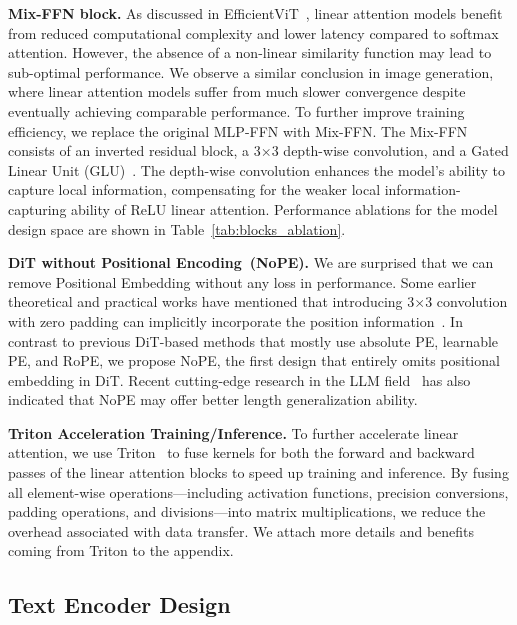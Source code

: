 \noindent\textbf{Mix-FFN block.}
As discussed in EfficientViT~\citep{cai2023efficientvit}, linear attention models benefit from reduced computational complexity and lower latency compared to softmax attention. However, the absence of a non-linear similarity function may lead to sub-optimal performance. We observe a similar conclusion in image generation, where linear attention models suffer from much slower convergence despite eventually achieving comparable performance.
To further improve training efficiency, we replace the original MLP-FFN with Mix-FFN. The Mix-FFN consists of an inverted residual block, a 3$\times$3 depth-wise convolution, and a Gated Linear Unit (GLU)~\citep{dauphin2017language}. The depth-wise convolution enhances the model's ability to capture local information, compensating for the weaker local information-capturing ability of ReLU linear attention. Performance ablations for the model design space are shown in Table~\ref{tab:blocks_ablation}.

\noindent\textbf{DiT without Positional Encoding~(NoPE).} 
We are surprised that we can remove Positional Embedding without any loss in performance. Some earlier theoretical and practical works have mentioned that introducing 3$\times$3 convolution with zero padding can implicitly incorporate the position information~\citep{islam2020much,xie2021segformer}. 
In contrast to previous DiT-based methods that mostly use absolute PE, learnable PE, and RoPE, we propose NoPE, the first design that entirely omits positional embedding in DiT. Recent cutting-edge research in the LLM field~\citep{kazemnejad2024impact,haviv2022transformer} has also indicated that NoPE may offer better length generalization ability.


\noindent\textbf{Triton Acceleration Training/Inference.}
To further accelerate linear attention, we use Triton~\citep{tillet2019triton} to fuse kernels for both the forward and backward passes of the linear attention blocks to speed up training and inference.
By fusing all element-wise operations—including activation functions, precision conversions, padding operations, and divisions—into matrix multiplications, we reduce the overhead associated with data transfer. We attach more details and benefits coming from Triton to the appendix.


\subsection{Text Encoder Design} \label{sec:text_encoder}

